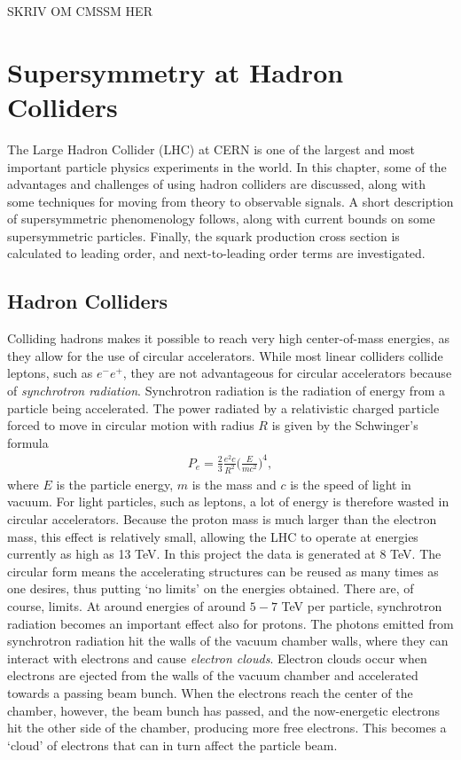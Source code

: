 \documentclass[twoside,english]{uiofysmaster}
\begin{document}
SKRIV OM CMSSM HER




\chapter{Supersymmetry at Hadron Colliders}

The Large Hadron Collider (LHC) at CERN is one of the largest and most important particle physics experiments in the world. In this chapter, some of the advantages and challenges of using hadron colliders are discussed, along with some techniques for moving from theory to observable signals. A short description of supersymmetric phenomenology follows, along with current bounds on some supersymmetric particles. Finally, the squark production cross section is calculated to leading order, and next-to-leading order terms are investigated.

\section{Hadron Colliders}

Colliding hadrons makes it possible to reach very high center-of-mass energies, as they allow for the use of circular accelerators. While most linear colliders collide leptons, such as $e^- e^+$, they are not advantageous for circular accelerators because of \textit{synchrotron radiation}. Synchrotron radiation is the radiation of energy from a particle being accelerated. The power radiated by a relativistic charged particle forced to move in circular motion with radius $R$ is given by the Schwinger's formula \cite{Balerna2015}
\begin{align}
P_e = \frac{2}{3} \frac{e^2c }{R^2} \Bigg( \frac{E}{mc^2} \Bigg)^4,
\end{align}
where $E$ is the particle energy, $m$ is the mass and $c$ is the speed of light in vacuum. For light particles, such as leptons, a lot of energy is therefore wasted in circular accelerators. Because the proton mass is much larger than the electron mass, this effect is relatively small, allowing the LHC to operate at energies currently as high as 13 TeV. In this project the data is generated at $8$ TeV. The circular form means the accelerating structures can be reused as many times as one desires, thus putting `no limits' on the energies obtained. There are, of course, limits. At around energies of around $5-7$ TeV per particle, synchrotron radiation becomes an important effect also for protons. The photons emitted from synchrotron radiation hit the walls of the vacuum chamber walls, where they can interact with electrons and cause \textit{electron clouds}. Electron clouds occur when electrons are ejected from the walls of the vacuum chamber and accelerated towards a passing beam bunch. When the electrons reach the center of the chamber, however, the beam bunch has passed, and the now-energetic electrons hit the other side of the chamber, producing more free electrons. This becomes a `cloud' of electrons that can in turn affect the particle beam. 
\end{document}
